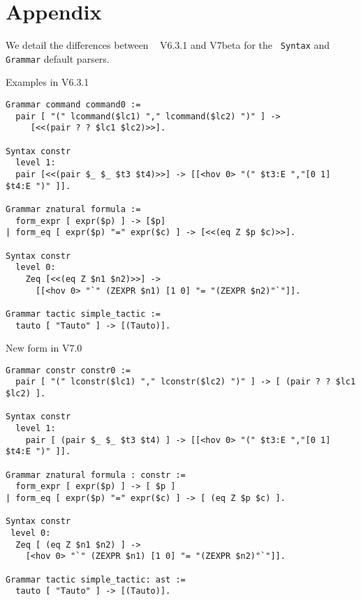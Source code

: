 \documentclass[11pt]{article}
\begin{document}
\section*{Appendix}
\label{Appendix}
We detail the differences between \Coq~ V6.3.1 and V7beta for the {\tt
Syntax} and {\tt Grammar} default parsers.

\medskip

Examples in V6.3.1

\begin{verbatim}
Grammar command command0 :=
  pair [ "(" lcommand($lc1) "," lcommand($lc2) ")" ] ->
	 [<<(pair ? ? $lc1 $lc2)>>].

Syntax constr
  level 1:
  pair [<<(pair $_ $_ $t3 $t4)>>] -> [[<hov 0> "(" $t3:E ","[0 1] $t4:E ")" ]].

Grammar znatural formula :=
  form_expr [ expr($p) ] -> [$p]
| form_eq [ expr($p) "=" expr($c) ] -> [<<(eq Z $p $c)>>].

Syntax constr
  level 0:
    Zeq [<<(eq Z $n1 $n2)>>] -> 
      [[<hov 0> "`" (ZEXPR $n1) [1 0] "= "(ZEXPR $n2)"`"]].

Grammar tactic simple_tactic :=
  tauto [ "Tauto" ] -> [(Tauto)].
\end{verbatim}

New form in V7.0

\begin{verbatim}
Grammar constr constr0 :=
  pair [ "(" lconstr($lc1) "," lconstr($lc2) ")" ] -> [ (pair ? ? $lc1 $lc2) ].

Syntax constr
  level 1:
    pair [ (pair $_ $_ $t3 $t4) ] -> [[<hov 0> "(" $t3:E ","[0 1] $t4:E ")" ]].

Grammar znatural formula : constr :=
  form_expr [ expr($p) ] -> [ $p ]
| form_eq [ expr($p) "=" expr($c) ] -> [ (eq Z $p $c) ].

Syntax constr
 level 0:
  Zeq [ (eq Z $n1 $n2) ] -> 
    [<hov 0> "`" (ZEXPR $n1) [1 0] "= "(ZEXPR $n2)"`"]].

Grammar tactic simple_tactic: ast :=
  tauto [ "Tauto" ] -> [(Tauto)].
\end{verbatim}
\end{document}
